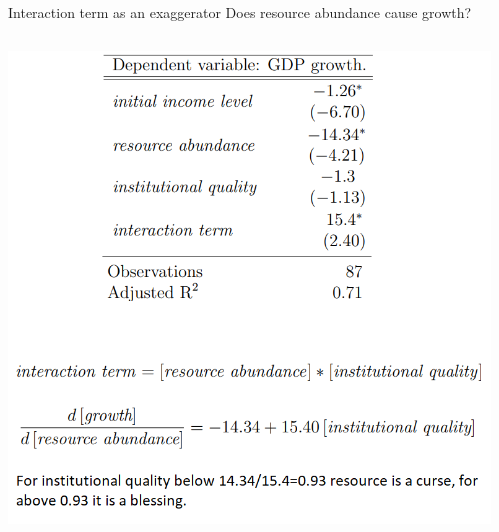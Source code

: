 \documentclass{beamer}
\begin{document}
\begin{frame}{Interaction term as an exaggerator}
Does resource abundance cause growth? \citep{mehlum2006institutions}
\begin{columns}
	\begin{column}{.7\textwidth}
  \quad	\includegraphics[width=.9\linewidth]{./Figures/resourcecurse.png}%
	\end{column}
	\begin{column}{.3\textwidth}
		\begin{center}
    \end{center}
    \end{column}
\end{columns}

\end{frame}
\end{document}
